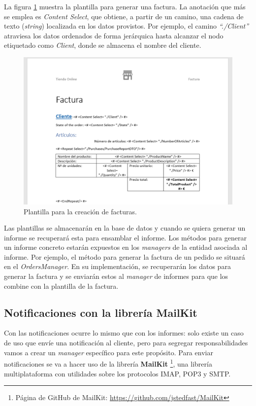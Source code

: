 \documentclass[11pt,spanish,listoffigures]{tfgetsinf}
\begin{document}
La figura \ref{fig:Factura} muestra la plantilla para generar una factura. La anotación que más se emplea es \textit{Content Select}, que obtiene, a partir de un camino, una cadena de texto (\textit{string}) localizada en los datos provistos. Por ejemplo, el camino \textit{``./Client''} atraviesa los datos ordenados de forma jerárquica hasta alcanzar el nodo etiquetado como \textit{Client}, donde se almacena el nombre del cliente.

\begin{figure}[h]
\centering
\includegraphics[scale=0.5]{Factura}
\caption{Plantilla para la creación de facturas.}
\label{fig:Factura}
\end{figure}

Las plantillas se almacenarán en la base de datos y cuando se quiera generar un informe se recuperará esta para ensamblar el informe. Los métodos para generar un informe concreto estarán expuestos en los \textit{managers} de la entidad asociada al informe. Por ejemplo, el método para generar la factura de un pedido se situará en el \textit{OrdersManager}. En su implementación, se recuperarán los datos para generar la factura y se enviarán estos al \textit{manager} de informes para que los combine con la plantilla de la factura.

\newpage

\subsection{Notificaciones con la librería MailKit}

Con las notificaciones ocurre lo mismo que con los informes: solo existe un caso de uso que envíe una notificación al cliente, pero para segregar responsabilidades vamos a crear un \textit{manager} específico para este propósito. Para enviar notificaciones se va a hacer uso de la librería \textbf{MailKit} \footnote{ Página de GitHub de MailKit: \url{https://github.com/jstedfast/MailKit}}, una librería multiplataforma con utilidades sobre los protocolos IMAP, POP3 y SMTP.
\end{document}
